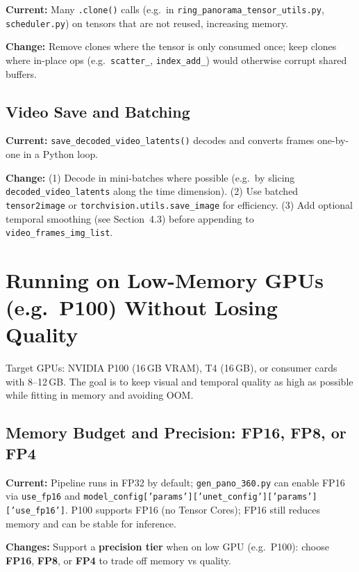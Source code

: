 \documentclass[11pt,a4paper]{article}
\newcommand{\file}[1]{\texttt{#1}}
\newcommand{\fn}[1]{\texttt{#1}}
\begin{document}
\textbf{Current:} Many \fn{.clone()} calls (e.g.\ in \file{ring\_panorama\_tensor\_utils.py}, \file{scheduler.py}) on tensors that are not reused, increasing memory.

\textbf{Change:} Remove clones where the tensor is only consumed once; keep clones where in-place ops (e.g.\ \fn{scatter\_}, \fn{index\_add\_}) would otherwise corrupt shared buffers.

\subsection{Video Save and Batching}

\textbf{Current:} \fn{save\_decoded\_video\_latents()} decodes and converts frames one-by-one in a Python loop.

\textbf{Change:} (1) Decode in mini-batches where possible (e.g.\ by slicing \fn{decoded\_video\_latents} along the time dimension). (2) Use batched \fn{tensor2image} or \fn{torchvision.utils.save\_image} for efficiency. (3) Add optional temporal smoothing (see Section~4.3) before appending to \fn{video\_frames\_img\_list}.

\section{Running on Low-Memory GPUs (e.g.\ P100) Without Losing Quality}

Target GPUs: NVIDIA P100 (16\,GB VRAM), T4 (16\,GB), or consumer cards with 8--12\,GB. The goal is to keep visual and temporal quality as high as possible while fitting in memory and avoiding OOM.

\subsection{Memory Budget and Precision: FP16, FP8, or FP4}

\textbf{Current:} Pipeline runs in FP32 by default; \file{gen\_pano\_360.py} can enable FP16 via \fn{use\_fp16} and \fn{model\_config['params']['unet\_config']['params']['use\_fp16']}. P100 supports FP16 (no Tensor Cores); FP16 still reduces memory and can be stable for inference.

\textbf{Changes:} Support a \textbf{precision tier} when on low GPU (e.g.\ P100): choose \textbf{FP16}, \textbf{FP8}, or \textbf{FP4} to trade off memory vs quality.
\end{document}
